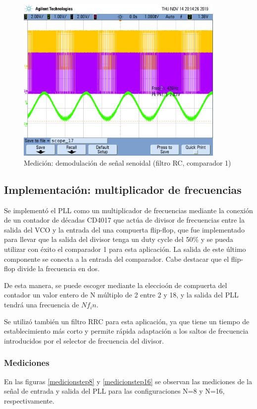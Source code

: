 \begin{figure}[H]
    \centering
    \includegraphics[width=0.9\textwidth]{../Ex2/resources/demodulacionfmsenoidalcomp1.png}
    \caption{Medición: demodulación de señal senoidal (filtro RC, comparador 1)}
    \label{modulacionfmsenoidalcomp1}
\end{figure}

\subsection{Implementación: multiplicador de frecuencias}
Se implementó el PLL como un multiplicador de frecuencias mediante la conexión de un contador de décadas CD4017 que actúa de divisor de frecuencias entre la salida del VCO y la entrada del una compuerta flip-flop, que fue implementado para llevar que la salida del divisor tenga un duty cycle del 50\% y se pueda utilizar con éxito el comparador 1 para esta aplicación. La salida de este último componente se conecta a la entrada del comparador. Cabe destacar que el flip-flop divide la frecuencia en dos.

De esta manera, se puede escoger mediante la eleccioón de compuerta del contador un valor entero de N múltiplo de 2 entre 2 y 18, y la salida del PLL tendrá una frecuencia de $Nf_in$.


Se utilizó también un filtro RRC para esta aplicación, ya que tiene un tiempo de establecimiento más corto y permite rápida adaptación a los saltos de frecuencia introducidos por el selector de frecuencia del divisor.

\subsubsection{Mediciones}
En las figuras \ref{medicionstep8} y \ref{medicionstep16} se observan las mediciones de la señal de entrada y salida del PLL para las configuraciones N=8 y N=16, respectivamente.

